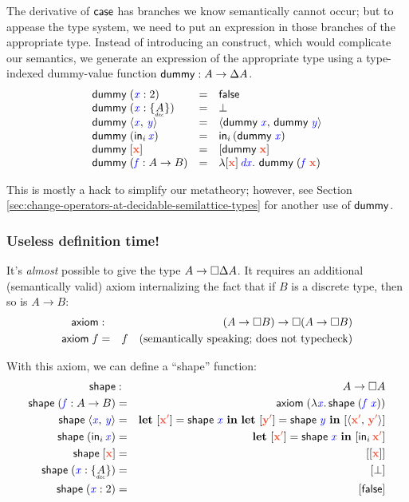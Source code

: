 \documentclass{rntz}
\newcommand{\dummy}{\ms{dummy}}
\newcommand{\shape}{\ms{shape}}
\begin{document}
The derivative of $\mathsf{case}$ has branches we know semantically cannot occur; but to appease the type system, we need to put an expression in those branches of the appropriate type.
%
Instead of introducing an  construct, which would complicate our semantics, we generate an expression of the appropriate type using a type-indexed dummy-value function $\dummy{} : A \to \Ch{A}$.
%
\[
\begin{array}{lcl}
  \dummy\; (\m{x} : \tbool) &=& \efalse\\
  \dummy\; (\m{x} : \Seteq{A}) &=& \unit\\
  \dummy\; \pair{\m{x}}{\m{y}} &=& \pair{\dummy\;\m{x}}{\dummy\;\m{y}}\\
  \dummy\; (\inj{i}{\m{x}}) &=& \inj{i}{(\dummy\;\m{x})}\\
  \dummy\; \disc{\d{x}} &=& \disc{\dummy\; \d{x}}\\
  \dummy\; (\m{f} : A \to B) &=&
    \fn \disc{\d{x}} \, \m{dx} \binder\, \dummy\;(\m{f}\;\d{x})
\end{array}
\]

This is mostly a hack to simplify our metatheory; however, see Section \ref{sec:change-operators-at-decidable-semilattice-types} for another use of $\mathsf{dummy}$.


\subsubsection{Useless definition time!}

It's \emph{almost} possible to give \dummy{} the type $A \to \square{\Delta A}$.
%
It requires an additional (semantically valid) axiom internalizing the fact that if $B$ is a discrete type, then so is $A \to B$:
%
\begin{eqnarray*}
  \mathsf{axiom} &:& (A \to \square{B}) \to \square{(}A \to \square{B})\\
  \mathsf{axiom}\;f &=& f \quad\text{(semantically speaking; does not typecheck)}
\end{eqnarray*}

With this axiom, we can define a ``shape'' function:
%
\begin{eqnarray*}
  \shape &:& A \to \Disc{A}\\
  \shape\; (\m{f} : A \to B) &=&
    \ms{axiom}\; (\lam{\m{x}} \shape\; (\m{f}\;\m{x}))\\
  \shape\; \pair{\m{x}}{\m{y}} &=&
    \letdisc{\d{x'}}{\shape\;\m{x}}
    \letdisc{\d{y'}}{\shape\;\m{y}}
    \disc{\pair{\d{x'}}{\d{y'}}}\\
  \shape\; (\inj{i}{\m{x}}) &=&
    \letdisc{\d{x'}}{\shape\;\m x} \disc{\inj{i}{\d{x'}}}\\
  \shape\; \disc{\d{x}} &=& \disc{\disc{\d{x}}}\\
  \shape\; (\m{x} : \Seteq{A}) &=& \disc{\bot}\\
  \shape\; (\m{x} : 2) &=& \disc{\efalse}
\end{eqnarray*}
\end{document}
